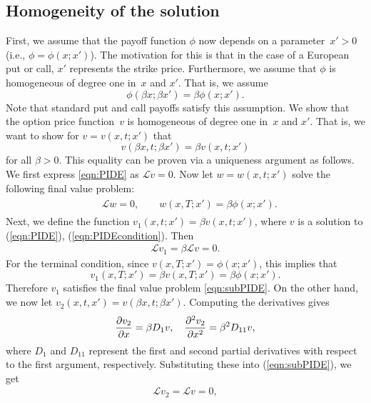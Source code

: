 \subsection{Homogeneity of the solution}
First, we assume that the payoff function $\phi$ now depends on a parameter~$x' > 0$ (i.e., $\phi = \phi(x;x')$).  The motivation for this is that in the case of a European put or call, $x'$ represents the strike price. Furthermore, we assume that $\phi$ is homogeneous of degree one in~$x$ and $x'$. That is, we assume
$$
	\phi(\beta x; \beta x') = \beta \phi(x;x').
$$ 
Note that standard put and call payoffs satisfy this assumption. We show that the option price function~$v$ is homogeneous of degree one in~$x$ and $x'$. That is, we want to show for $v = v(x,t; x')$ that
		\begin{equation}
			\label{eqn:homogen}
			v(\beta x, t; \beta x') = \beta v(x,t; x')
		\end{equation}
for all $\beta > 0$. This equality can be proven via a uniqueness argument as follows. We first express \eqref{eqn:PIDE} as $\mathscr{L} v = 0$. Now let $w = w(x,t; x')$ solve the following final value problem:
		\begin{align}
			\label{eqn:subPIDE}
			\begin{split}
			&\mathscr{L}w = 0, \qquad w(x,T; x') = \beta\phi(x;x').
			\end{split}
		\end{align}
Next, we define the function $v_1(x,t;x') = \beta v(x,t;x')$, where $v$ is a solution to (\ref{eqn:PIDE}), (\ref{eqn:PIDEcondition}). Then
	\begin{align*}
		\mathscr{L}v_1 = \beta \mathscr{L}v = 0.
	\end{align*}
For the terminal condition, since $v(x,T;x') = \phi(x;x')$, this implies that
	\begin{equation*}
		v_1(x,T;x') = \beta v(x,T; x') = \beta\phi(x;x').
	\end{equation*}
Therefore $v_1$ satisfies the final value problem \eqref{eqn:subPIDE}. On the other hand, we now let $v_2(x,t,x') = v(\beta x, t; \beta x')$. Computing the derivatives gives
	\begin{equation*}
		\frac{\partial v_2}{\partial x} = \beta D_1v, \quad \frac{\partial^2 v_2}{\partial x^2} = \beta^2 D_{11}v,
	\end{equation*}
where $D_1$ and $D_{11}$ represent the first and second partial derivatives with respect to the first argument, respectively. Substituting these into (\ref{eqn:subPIDE}), we get
	\begin{align*}
		\mathscr{L}v_2 = \mathscr{L}v = 0,
	\end{align*}
